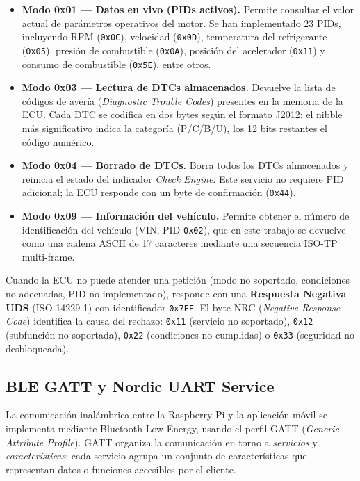 \begin{itemize}
    \item \textbf{Modo 0x01 — Datos en vivo (PIDs activos).} Permite consultar el valor actual de parámetros operativos del motor. Se han implementado 23 PIDs, incluyendo RPM (\texttt{0x0C}), velocidad (\texttt{0x0D}), temperatura del refrigerante (\texttt{0x05}), presión de combustible (\texttt{0x0A}), posición del acelerador (\texttt{0x11}) y consumo de combustible (\texttt{0x5E}), entre otros.

    \item \textbf{Modo 0x03 — Lectura de DTCs almacenados.} Devuelve la lista de códigos de avería (\textit{Diagnostic Trouble Codes}) presentes en la memoria de la ECU. Cada DTC se codifica en dos bytes según el formato J2012: el nibble más significativo indica la categoría (P/C/B/U), los 12 bits restantes el código numérico.

    \item \textbf{Modo 0x04 — Borrado de DTCs.} Borra todos los DTCs almacenados y reinicia el estado del indicador \textit{Check Engine}. Este servicio no requiere PID adicional; la ECU responde con un byte de confirmación (\texttt{0x44}).

    \item \textbf{Modo 0x09 — Información del vehículo.} Permite obtener el número de identificación del vehículo (VIN, PID \texttt{0x02}), que en este trabajo se devuelve como una cadena ASCII de 17 caracteres mediante una secuencia ISO-TP multi-frame.
\end{itemize}

Cuando la ECU no puede atender una petición (modo no soportado, condiciones no adecuadas, PID no implementado), responde con una \textbf{Respuesta Negativa UDS} (ISO 14229-1) con identificador \texttt{0x7EF}. El byte NRC (\textit{Negative Response Code}) identifica la causa del rechazo: \texttt{0x11} (servicio no soportado), \texttt{0x12} (subfunción no soportada), \texttt{0x22} (condiciones no cumplidas) o \texttt{0x33} (seguridad no desbloqueada).


\subsection{BLE GATT y Nordic UART Service}
\label{sec:proto_ble}

La comunicación inalámbrica entre la Raspberry Pi y la aplicación móvil se implementa mediante Bluetooth Low Energy, usando el perfil GATT (\textit{Generic Attribute Profile}). GATT organiza la comunicación en torno a \textit{servicios} y \textit{características}: cada servicio agrupa un conjunto de características que representan datos o funciones accesibles por el cliente.

